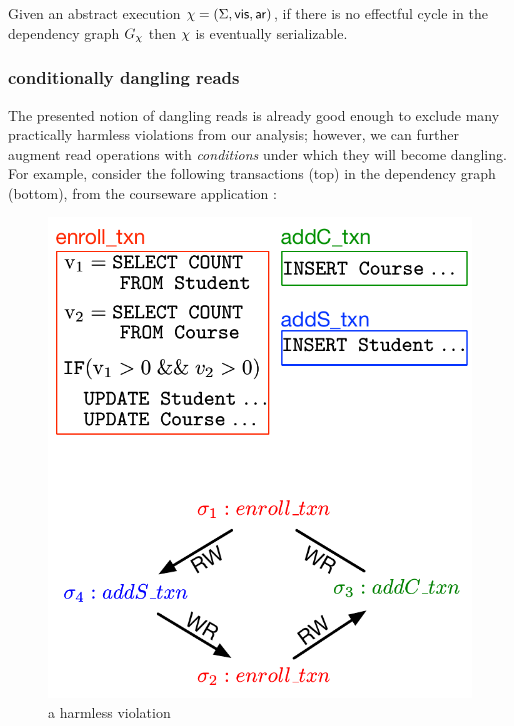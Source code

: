 \begin{theorem}
  Given an abstract execution $ \chi = (\Sigma,\mathsf{vis},\mathsf{ar})$, if there
  is no effectful cycle in the dependency graph $G_\chi$ then $\chi$ is
  eventually serializable.
\end{theorem}

\subsubsection{conditionally dangling reads}
The presented notion of dangling reads is already good enough to exclude many
practically harmless violations from our analysis; however, we can
further augment read operations with \emph{conditions} under which
they will become dangling. For example, consider the following transactions
(top)
in the dependency graph (bottom), from the courseware
application \cite{Gotsman:cise}: 
\begin{figure}[h]
  \begin{center}
    \includegraphics[scale=0.5]{figures/conditional_dangling.pdf}
  \end{center}
  \caption{a harmless violation}
  \label{fig:dangling}
\end{figure}

